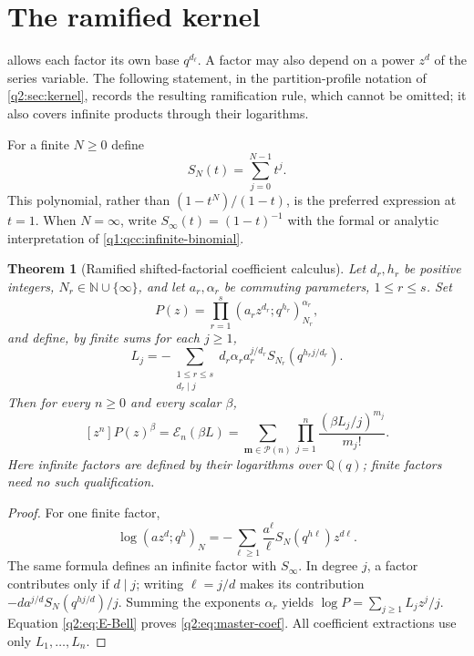 \documentclass[11pt,a4paper,oneside,openany]{book}
\newtheorem{theorem}{Theorem}[chapter]
\theoremstyle{definition}
\theoremstyle{remark}
\newcommand{\N}{\mathbb N}
\newcommand{\Q}{\mathbb Q}
\newcommand{\poch}[3]{(#1;#2)_{#3}}
\newcommand{\Ecal}{\mathcal E}
\newcommand{\Pcal}{\mathcal P}
\begin{document}
\section{The ramified kernel}
\label{q2:sec:ramified}
 allows each factor its own base \(q^{d_\ell}\).
A factor may also depend on a power \(z^{d}\) of the series variable. The
following statement, in the partition-profile notation of
\cref{q2:sec:kernel}, records the resulting ramification rule, which cannot
be omitted; it also covers infinite products through their logarithms.


For a finite $N\ge0$ define
\begin{equation}\label{q2:eq:S}
 S_N(t)=\sum_{j=0}^{N-1}t^j.
\end{equation}
This polynomial, rather than $(1-t^N)/(1-t)$, is the preferred expression at
$t=1$. When $N=\infty$, write $S_\infty(t)=(1-t)^{-1}$ with the formal or
analytic interpretation of \cref{q1:qcc:infinite-binomial}.

\begin{theorem}[Ramified shifted-factorial coefficient calculus]\label{q2:thm:master}
Let $d_r,h_r$ be positive integers, $N_r\in\N\cup\{\infty\}$, and let
$a_r,\alpha_r$ be commuting parameters, $1\le r\le s$. Set
\begin{equation}\label{q2:eq:master-P}
 P(z)=\prod_{r=1}^s\poch{a_r z^{d_r}}{q^{h_r}}{N_r}^{\alpha_r},
\end{equation}
and define, by finite sums for each $j\ge1$,
\begin{equation}\label{q2:eq:master-L}
 L_j=-\sum_{\substack{1\le r\le s\\d_r\mid j}}
       d_r\alpha_r a_r^{j/d_r}
             S_{N_r}\!\left(q^{h_rj/d_r}\right).
\end{equation}
Then for every $n\ge0$ and every scalar $\beta$,
\begin{equation}\label{q2:eq:master-coef}
 [z^n]P(z)^\beta
 =\Ecal_n(\beta L)
 =\sum_{\bm m\in\Pcal(n)}\prod_{j=1}^n
                   \frac{(\beta L_j/j)^{m_j}}{m_j!}.
\end{equation}
Here infinite factors are defined by their logarithms over $\Q(q)$; finite
factors need no such qualification.
\end{theorem}
\begin{proof}
For one finite factor,
\[
 \log\poch{az^d}{q^h}N
  =-\sum_{\ell\ge1}\frac{a^\ell}{\ell}
               S_N(q^{h\ell})z^{d\ell}.
\]
The same formula defines an infinite factor with $S_\infty$. In degree $j$, a
factor contributes only if $d\mid j$; writing $\ell=j/d$ makes its contribution
$-d a^{j/d}S_N(q^{hj/d})/j$. Summing the exponents $\alpha_r$ yields
$\log P=\sum_{j\ge1}L_jz^j/j$. Equation \eqref{q2:eq:E-Bell} proves
\eqref{q2:eq:master-coef}. All coefficient extractions use only $L_1,\ldots,L_n$.
\end{proof}
\end{document}
